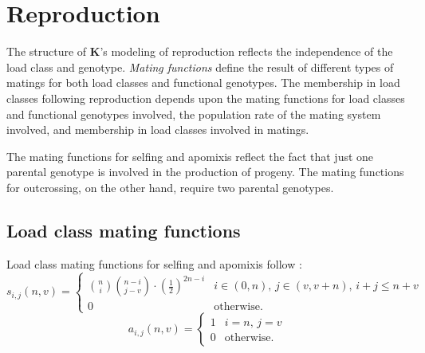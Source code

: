 \documentclass[10pt,twoside,a4paper,fleqn]{report}
\numberwithin{equation}{section}  %
\newcommand{\K}{{\bf K}}
\newcommand{\funcself}{\mbox{$s_{i,j}(n,v)$}}
\newcommand{\funcapomixis}{\mbox{$a_{i,j}(n,v)$}}
\begin{document}
{%
\chapter{Reproduction}
\label{chapter:Kreproduction}

The structure of \K's modeling of reproduction reflects the independence of the load class and genotype.  {\em Mating functions} define the result of different types of matings for both load classes and functional genotypes.  The membership in load classes following reproduction depends upon the mating functions for load classes and functional genotypes involved, the population rate of the mating system involved, and membership in load classes involved in matings.

The mating functions for selfing and apomixis reflect the fact that just one parental genotype is involved in the production of progeny.  The mating functions for outcrossing, on the other hand, require two parental genotypes.

\section{Load class mating functions}

Load class mating functions for selfing and apomixis follow \citet{Kondrashov:1985:5375}:
\begin{equation}
\label{eq:Kreproduction:s}
\funcself =
    \begin{cases}
        \binom{n}{i}\binom{n-i}{j-v}\cdot\left({\frac{1}{2}}\right)^{2n-i} & \text{$i\in(0,n)$, $j\in(v,v + n)$, $i+j \leq n+v$} \\
        0                                                                  & \text{otherwise.} 
    \end{cases}
\end{equation}
\begin{equation}
\label{eq:Kreproduction:a}
\funcapomixis = 
    \begin{cases}
        1  &  \text{$i=n$, $j=v$} \\
        0  &  \text{otherwise.}  
    \end{cases}
\end{equation}

}
\end{document}
